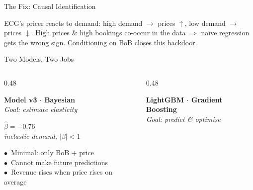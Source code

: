 \documentclass[aspectratio=169]{beamer}
\begin{document}
\begin{frame}{The Fix: Causal Identification}
\begin{tikzpicture}
\end{tikzpicture}

\vspace{0.5em}
{\small\color{darktext} ECG's pricer reacts to demand: high demand $\to$ prices $\uparrow$, low demand $\to$ prices $\downarrow$.
High prices \& high bookings co-occur in the data $\Rightarrow$ na\"{i}ve regression gets the wrong sign.
Conditioning on BoB closes this backdoor.}

\end{frame}

\begin{frame}{Two Models, Two Jobs}
\vspace{0.4em}
\begin{columns}[T,onlytextwidth]

\begin{column}{0.48\textwidth}
\begin{tcolorbox}[
  colback=cardblue, colframe=cardborder,
  arc=3pt, boxrule=0.6pt,
  left=10pt, right=10pt, top=10pt, bottom=10pt
]
  {\bfseries\color{beamerblue} Model v3 $\cdot$ Bayesian}\\[1pt]
  {\footnotesize\itshape\color{lightgray} Goal: estimate elasticity}
  \vspace{10pt}

  \begin{tcolorbox}[
    colback=white, colframe=cardborder,
    arc=2pt, boxrule=0.5pt,
    left=4pt, right=4pt, top=4pt, bottom=4pt
  ]
    \centering
    {\bfseries\color{beamerblue} $\hat\beta = -0.76$}\\[-1pt]
    {\tiny\itshape\color{lightgray} inelastic demand, $|\beta|<1$}
  \end{tcolorbox}
  \vspace{8pt}

  {\footnotesize\color{darktext}
   $\bullet$\ Minimal: only BoB + price\\[4pt]
   $\bullet$\ Cannot make future predictions\\[4pt]
   $\bullet$\ Revenue rises when price rises on average}
\end{tcolorbox}
\end{column}

\begin{column}{0.48\textwidth}
\begin{tcolorbox}[
  colback=cardgreen, colframe=greenborder,
  arc=3pt, boxrule=0.6pt,
  left=10pt, right=10pt, top=10pt, bottom=10pt
]
  {\bfseries\color{darkgreen} LightGBM $\cdot$ Gradient Boosting}\\[1pt]
  {\footnotesize\itshape\color{lightgray} Goal: predict \& optimise}
  \vspace{10pt}


\end{tcolorbox}
\end{column}
\end{columns}
\end{frame}
\end{document}

